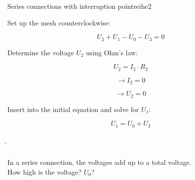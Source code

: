\begin{frame}
{\begin{expl}{Series connections with interruption point}{reihe2}
\begin{center}
				
				
			\end{center}
			
			Set up the mesh counterclockwise:
			
			
			\begin{equation*}
				U_2+U_1-U_0-U_3 = 0
			\end{equation*}
			
			Determine the voltage $U_2$ using Ohm's law:
			
			
			\begin{equation*}
				U_2=I_2 \cdot R_2
			\end{equation*}
			
			\begin{equation*}
				\rightarrow I_2 = 0
			\end{equation*}
			
			\begin{equation*}
				\rightarrow U_2 = 0
			\end{equation*}
			
			Insert into the initial equation and solve for $U_1$: 	
			
			\begin{equation*}
				U_1 = U_0 + U_3
			\end{equation*}

			
		\end{expl}
		
	}
	
	\newpage
	
	\b{
		
		\begin{columns}
			
			\vspace{-50pt}
			In a series connection, the voltages add up to a
			total voltage.\\
			How high is the voltage? $U_0$?
			
			
			

		\end{columns}
		
		\begin{columns}
			\column[t]{0.6\textwidth}
			

\end{columns}}
\end{frame}
